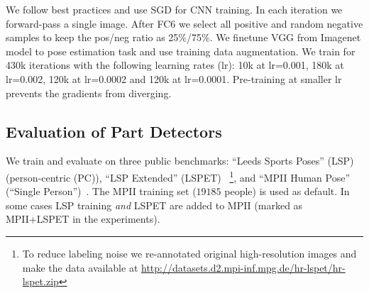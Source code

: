 
 We follow best practices and use SGD for CNN
training. In each iteration we forward-pass a single image. After FC6 we
select all positive and random negative samples to keep the pos/neg
ratio as 25\%/75\%. We finetune VGG from Imagenet model to pose
estimation task and use training data augmentation. We train for 430k
iterations with the following learning rates (lr): 10k at lr=0.001,
180k at lr=0.002, 120k at lr=0.0002 and 120k at
lr=0.0001. Pre-training at smaller lr prevents the gradients from
diverging.




\subsection{Evaluation of Part Detectors}
\label{sec:experiments:unary}

 We train and evaluate on three public
benchmarks: ``Leeds Sports Poses'' (LSP)~\cite{johnson10bmvc}
(person-centric (PC)),
``LSP Extended'' (LSPET)
~\cite{johnson11cvpr}\footnote{To reduce labeling noise we re-annotated original
  high-resolution images and make the data available at \url{http://datasets.d2.mpi-inf.mpg.de/hr-lspet/hr-lspet.zip}}, and  %
``MPII Human Pose'' (``Single Person'')~\cite{andriluka14cvpr}.
The MPII training set ($19185$ people) is used as default. In some
cases LSP training \textit{and} LSPET are added to MPII (marked as MPII+LSPET in the
experiments).

